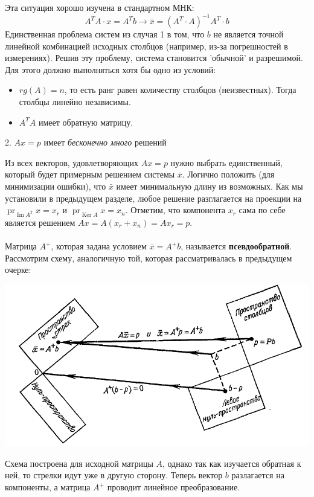 \documentclass[a4paper,12pt]{article}
\begin{document}
Эта ситуация хорошо изучена в стандартном МНК:
\[ A^TA \cdot x = A^T b \rightarrow \bar{x} = (A^T \cdot A)^{-1} A^T \cdot b\]
Единственная проблема систем из случая 1 в том, что $b$ не является точной линейной комбинацией исходных столбцов (например, из-за погрешностей в измерениях). Решив эту проблему, система становится 'обычной' и разрешимой. Для этого должно выполняться хотя бы одно из условий:
\begin{itemize}
    \item $rg(A) = n$, то есть ранг равен количеству столбцов (неизвестных). Тогда столбцы линейно независимы.
    \item $A^TA$ имеет обратную матрицу.  
\end{itemize}
\begin{center}
   2. $Ax = p$ имеет \textit{бесконечно много} решений
\end{center}
Из всех векторов, удовлетворяющих $Ax = p$ нужно выбрать единственный, который будет примерным решением системы $\bar{x}$. Логично положить (для минимизации ошибки), что $\bar{x}$ имеет минимальную длину из возможных. Как мы установили в предыдущем разделе, любое решение разглагается на проекции на $\operatorname{pr}_{\operatorname{Im} A^T} x = x_r$ и
$ \operatorname{pr}_{\operatorname{Ker} A} x = x_n$. Отметим, что компонента $x_r$ сама по себе является решением $Ax = A(x_r + x_n) = Ax_r = p$. \\
\\
Матрица $A^+$, которая задана условием $\bar{x} = A^+ b$, называется \textbf{псевдообратной}. 
Рассмотрим схему, аналогичную той, которая рассматривалась в предыдущем очерке:
\begin{center}
    \includegraphics[width = 14 cm]{F.png}
\end{center}
Схема построена для исходной матрицы $A$, однако так как изучается обратная к ней, то стрелки идут уже в другую сторону. Теперь вектор $b$ разлагается на компоненты, а матрица $A^+$ проводит линейное преобразование. \\
\end{document}
